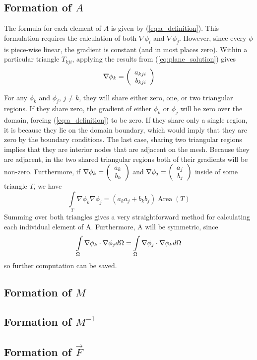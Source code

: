 \documentclass[a4paper,12pt]{article}
\begin{document}
\subsection{Formation of $A$}
The formula for each element of $A$ is given by (\ref{eq:a_definition}). This formulation requires the calculation
of both $\nabla \phi_i$ and $\nabla \phi_j$. However, since every $\phi$ is piece-wise linear, the gradient
is constant (and in most places zero). Within a particular triangle $T_{kji}$, applying the results from
(\ref{eq:plane_solution}) gives
\begin{equation} \label{eq:grad_phi_definition}
\nabla \phi_k = \left(\begin{array}{rrrr} a_{kji} \\ b_{kji} \\ \end{array} \right)
\end{equation}

For any $\phi_k$ and $\phi_j$, $j \ne k$, they will share either zero, one, or two triangular regions. If they share
zero, the gradient of either $\phi_k$ or $\phi_j$ will be zero over the domain, forcing (\ref{eq:a_definition}) to
be zero. If they share only a single region, it is because they lie on the domain boundary, which would imply that
they are zero by the boundary conditions. The last case, sharing two triangular regions implies that they are interior
nodes that are adjacent on the mesh. Because they are adjacent, in the two shared triangular regions both of their
gradients will be non-zero. Furthermore, if $\nabla \phi_k = \left(\begin{array}{rrrr} a_k \\ b_k \\ \end{array} \right)$ and $\nabla \phi_j = \left(\begin{array}{rrrr} a_j \\ b_j \\ \end{array} \right)$
inside of some triangle $T$, we have
\begin{equation}
\int\limits_T \nabla \phi_k \nabla \phi_j
=
\left( a_k a_j + b_k b_j \right) \mathop{Area}(T)
\end{equation}
Summing over both triangles gives a very straightforward method for calculating each individual element of A. Furthermore,
A will be symmetric, since
\begin{equation}
\int\limits_{\Omega} \nabla \phi_k \cdot \nabla \phi_j d\Omega = \int\limits_{\Omega} \nabla \phi_j \cdot \nabla \phi_k d\Omega
\end{equation}
so further computation can be saved.

\subsection{Formation of $M$}
\subsection{Formation of $M^{-1}$}
\subsection{Formation of $\vec{F}$}



\end{document}
